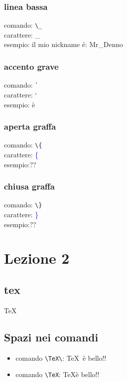 \documentclass{report}
\begin{document}
        \subsection{linea bassa}
            comando: \verb!\_! \\
            carattere: \textcolor{blue}{\_} \\
            esempio: il mio nickname \'e: Mr\textcolor{blue}{\_}Denno
        \subsection{accento grave}
            comando: \verb!`! \\
            carattere: \textcolor{blue}{`} \\
            esempio: \`{e}
        \subsection{aperta graffa}
            comando: \verb!\{! \\
            carattere: \textcolor{blue}{\{} \\
            esempio:??
        \subsection{chiusa graffa}
            comando: \verb!\}! \\    
            carattere: \textcolor{blue}{\}} \\
            esempio:??
        


    \chapter{Lezione 2}

        \section{tex}
            \TeX\

        \section{Spazi nei comandi}
            \begin{itemize}
                \item comando \verb!\TeX\!: \TeX\ è bello!! %
                \item comando \verb!\TeX!: \TeX è bello!! %
            \end{itemize}
        
\end{document}
